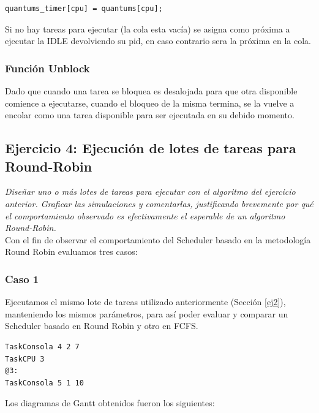 \documentclass[a4paper]{article}
\begin{document}
\begin{verbatim}
quantums_timer[cpu] = quantums[cpu];
\end{verbatim}

Si no hay tareas para ejecutar (la cola esta vacía) se asigna como próxima a ejecutar la IDLE devolviendo su pid, en caso contrario sera la próxima en la cola.

\subsubsection*{Funci\'on Unblock}	
	
Dado que cuando una tarea se bloquea es desalojada para que otra disponible comience a ejecutarse, cuando el bloqueo de la misma termina, se la vuelve a encolar como una tarea disponible para ser ejecutada en su debido momento. 
\bigskip 
 
 
 \subsection{Ejercicio 4: Ejecuci\'on de lotes de tareas para Round-Robin}


\textit{Dise\~nar uno o m\'as lotes de tareas para ejecutar con el algoritmo del ejercicio anterior. Graficar las simulaciones y comentarlas, justificando brevemente por qu\'e el comportamiento observado es efectivamente el esperable de un algoritmo Round-Robin.}\\


Con el fin de observar el comportamiento del Scheduler basado en la metodolog\'ia Round Robin evaluamos tres casos:

\subsubsection*{Caso 1}

Ejecutamos el mismo lote de tareas utilizado anteriormente (Secci\'on \ref{ej2}), manteniendo los mismos par\'ametros, para as\'i poder evaluar y comparar un Scheduler basado en Round Robin y otro en FCFS. 

	\begin{codesnippet}
	\begin{verbatim}
TaskConsola 4 2 7
TaskCPU 3
@3:
TaskConsola 5 1 10
	\end{verbatim}
	\end{codesnippet}

Los diagramas de Gantt obtenidos fueron los siguientes:
\end{document}
